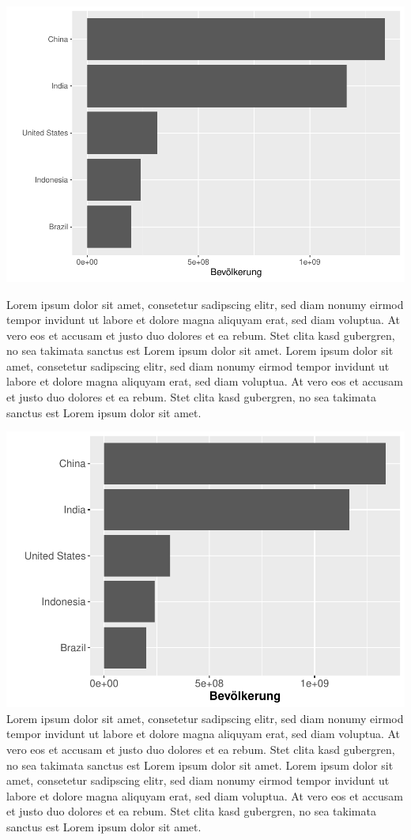\documentclass[
  twocolumn]{article}
\begin{document}
\twocolumn

\includegraphics{PDFoutputsamples_files/figure-latex/unnamed-chunk-3-1.pdf}

Lorem ipsum dolor sit amet, consetetur sadipscing elitr, sed diam nonumy
eirmod tempor invidunt ut labore et dolore magna aliquyam erat, sed diam
voluptua. At vero eos et accusam et justo duo dolores et ea rebum. Stet
clita kasd gubergren, no sea takimata sanctus est Lorem ipsum dolor sit
amet. Lorem ipsum dolor sit amet, consetetur sadipscing elitr, sed diam
nonumy eirmod tempor invidunt ut labore et dolore magna aliquyam erat,
sed diam voluptua. At vero eos et accusam et justo duo dolores et ea
rebum. Stet clita kasd gubergren, no sea takimata sanctus est Lorem
ipsum dolor sit amet. \newpage

\includegraphics{PDFoutputsamples_files/figure-latex/unnamed-chunk-4-1.pdf}
Lorem ipsum dolor sit amet, consetetur sadipscing elitr, sed diam nonumy
eirmod tempor invidunt ut labore et dolore magna aliquyam erat, sed diam
voluptua. At vero eos et accusam et justo duo dolores et ea rebum. Stet
clita kasd gubergren, no sea takimata sanctus est Lorem ipsum dolor sit
amet. Lorem ipsum dolor sit amet, consetetur sadipscing elitr, sed diam
nonumy eirmod tempor invidunt ut labore et dolore magna aliquyam erat,
sed diam voluptua. At vero eos et accusam et justo duo dolores et ea
rebum. Stet clita kasd gubergren, no sea takimata sanctus est Lorem
ipsum dolor sit amet.
\end{document}

